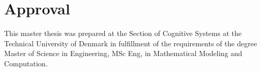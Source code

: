 \section*{Approval}
This master thesis was prepared at the Section of Cognitive Systems at the Technical University of Denmark in
fulfillment of the requirements of the degree Master of Science in Engineering, MSc Eng, in Mathematical Modeling and Computation.

\vfill

\begin{center}
\namesigdate{\thesisauthor~-~\studentnumber}
\end{center}

\vfill


